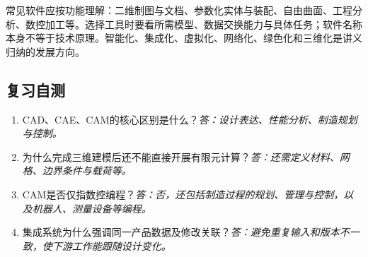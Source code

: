 常见软件应按功能理解：二维制图与文档、参数化实体与装配、自由曲面、工程分析、数控加工等。选择工具时要看所需模型、数据交换能力与具体任务；软件名称本身不等于技术原理。智能化、集成化、虚拟化、网络化、绿色化和三维化是讲义归纳的发展方向。

\subsection*{复习自测}
\begin{enumerate}
\item CAD、CAE、CAM的核心区别是什么？\textit{答：设计表达、性能分析、制造规划与控制。}
\item 为什么完成三维建模后还不能直接开展有限元计算？\textit{答：还需定义材料、网格、边界条件与载荷等。}
\item CAM是否仅指数控编程？\textit{答：否，还包括制造过程的规划、管理与控制，以及机器人、测量设备等编程。}
\item 集成系统为什么强调同一产品数据及修改关联？\textit{答：避免重复输入和版本不一致，使下游工作能跟随设计变化。}
\end{enumerate}
